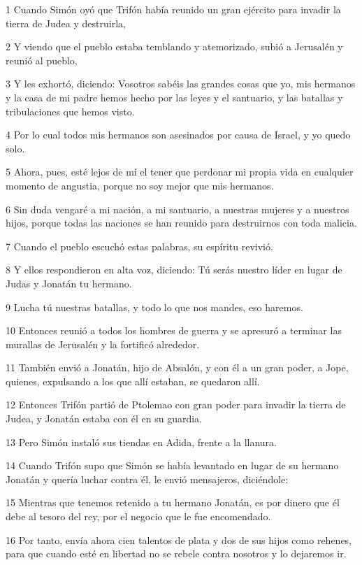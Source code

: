 \par 1 Cuando Simón oyó que Trifón había reunido un gran ejército para invadir la tierra de Judea y destruirla,
\par 2 Y viendo que el pueblo estaba temblando y atemorizado, subió a Jerusalén y reunió al pueblo,
\par 3 Y les exhortó, diciendo: Vosotros sabéis las grandes cosas que yo, mis hermanos y la casa de mi padre hemos hecho por las leyes y el santuario, y las batallas y tribulaciones que hemos visto.
\par 4 Por lo cual todos mis hermanos son asesinados por causa de Israel, y yo quedo solo.
\par 5 Ahora, pues, esté lejos de mí el tener que perdonar mi propia vida en cualquier momento de angustia, porque no soy mejor que mis hermanos.
\par 6 Sin duda vengaré a mi nación, a mi santuario, a nuestras mujeres y a nuestros hijos, porque todas las naciones se han reunido para destruirnos con toda malicia.
\par 7 Cuando el pueblo escuchó estas palabras, su espíritu revivió.
\par 8 Y ellos respondieron en alta voz, diciendo: Tú serás nuestro líder en lugar de Judas y Jonatán tu hermano.
\par 9 Lucha tú nuestras batallas, y todo lo que nos mandes, eso haremos.
\par 10 Entonces reunió a todos los hombres de guerra y se apresuró a terminar las murallas de Jerusalén y la fortificó alrededor.
\par 11 También envió a Jonatán, hijo de Absalón, y con él a un gran poder, a Jope, quienes, expulsando a los que allí estaban, se quedaron allí.
\par 12 Entonces Trifón partió de Ptolemao con gran poder para invadir la tierra de Judea, y Jonatán estaba con él en su guardia.
\par 13 Pero Simón instaló sus tiendas en Adida, frente a la llanura.
\par 14 Cuando Trifón supo que Simón se había levantado en lugar de su hermano Jonatán y quería luchar contra él, le envió mensajeros, diciéndole:
\par 15 Mientras que tenemos retenido a tu hermano Jonatán, es por dinero que él debe al tesoro del rey, por el negocio que le fue encomendado.
\par 16 Por tanto, envía ahora cien talentos de plata y dos de sus hijos como rehenes, para que cuando esté en libertad no se rebele contra nosotros y lo dejaremos ir.
